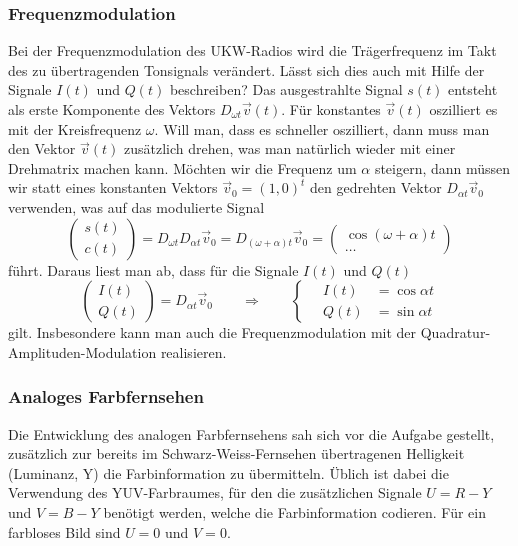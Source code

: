 \subsubsection{Frequenzmodulation}
Bei der Frequenzmodulation des UKW-Radios wird die Trägerfrequenz
im Takt des zu übertragenden Tonsignals verändert.
Lässt sich dies auch mit Hilfe der Signale $I(t)$ und $Q(t)$
beschreiben?
Das ausgestrahlte Signal $s(t)$ entsteht als erste Komponente
des Vektors $D_{\omega t}\vec{v}(t)$.
Für konstantes $\vec{v}(t)$ oszilliert es mit der Kreisfrequenz $\omega$.
Will man, dass es schneller oszilliert, dann muss man den Vektor
$\vec{v}(t)$ zusätzlich drehen, was man natürlich wieder mit einer
Drehmatrix machen kann.
Möchten wir die Frequenz um $\alpha$  steigern, dann müssen wir
statt eines konstanten Vektors $\vec{v}_0=(1,0)^t$ den gedrehten
Vektor $D_{\alpha t}\vec{v}_0$ verwenden, was auf das modulierte Signal
\[
\begin{pmatrix}
s(t)\\c(t)
\end{pmatrix}
=
D_{\omega t}D_{\alpha t}\vec{v}_0
=
D_{(\omega+\alpha)t}\vec{v}_0
=
\begin{pmatrix}
\cos(\omega+\alpha)t 
\\
\dots
\end{pmatrix}
\]
führt.
Daraus liest man ab, dass für die Signale $I(t)$ und $Q(t)$
\begin{equation}
\begin{pmatrix}I(t)\\Q(t)\end{pmatrix}
=
D_{\alpha t}\vec{v}_0
\qquad\Rightarrow\qquad
\left\{
\quad
\begin{aligned}
I(t)&=\cos\alpha t\\
Q(t)&=\sin\alpha t
\end{aligned}
\right.
\end{equation}
gilt.
Insbesondere kann man auch die Frequenzmodulation mit der
Quadratur-Amplituden-Modulation realisieren.

\subsubsection{Analoges Farbfernsehen}
Die Entwicklung des analogen Farbfernsehens sah sich vor die Aufgabe 
gestellt, zusätzlich zur bereits im Schwarz-Weiss-Fernsehen übertragenen
Helligkeit (Luminanz, Y) die Farbinformation zu übermitteln.
Üblich ist dabei die Verwendung des YUV-Farbraumes, für den die zusätzlichen
Signale $U=R-Y$ und $V=B-Y$ benötigt werden, welche die Farbinformation
codieren.
Für ein farbloses Bild sind $U=0$ und $V=0$.

